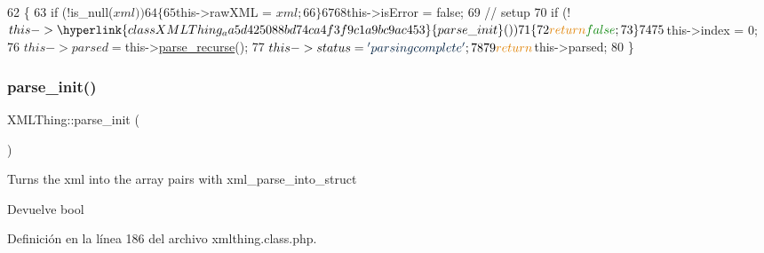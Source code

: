 \begin{DoxyCode}
62         \{
63                 \textcolor{keywordflow}{if} (!is\_null($xml))
64                 \{
65                         $this->rawXML = $xml;
66                 \}
67 
68                 $this->isError = \textcolor{keyword}{false};
69                         \textcolor{comment}{// setup}
70                 \textcolor{keywordflow}{if} (!$this->\hyperlink{classXMLThing_aa5d425088bd74ca4f3f9c1a9bc9ac453}{parse\_init}())
71                 \{
72                         \textcolor{keywordflow}{return} \textcolor{keyword}{false};
73                 \}
74 
75                 $this->index = 0;
76                 $this->parsed = $this->\hyperlink{classXMLThing_ae18a74c5d5979c699b42b1f9a8fedbba}{parse\_recurse}();
77                 $this->status = \textcolor{stringliteral}{'parsing complete'};
78 
79                 \textcolor{keywordflow}{return} $this->parsed;
80         \}
\end{DoxyCode}
\mbox{\label{classXMLThing_aa5d425088bd74ca4f3f9c1a9bc9ac453}} 
\subsubsection{\texorpdfstring{parse\+\_\+init()}{parse\_init()}}
{\footnotesize\ttfamily X\+M\+L\+Thing\+::parse\+\_\+init (\begin{DoxyParamCaption}{ }\end{DoxyParamCaption})}

Turns the xml into the array pairs with xml\+\_\+parse\+\_\+into\+\_\+struct \begin{DoxyReturn}{Devuelve}
bool 
\end{DoxyReturn}


Definición en la línea 186 del archivo xmlthing.\+class.\+php.


